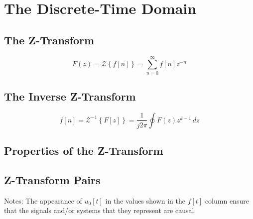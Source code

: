 \section*{The Discrete-Time Domain}
\subsection*{The Z-Transform}

$$
F(z) = \mathcal{Z}\left\{f[n]\right\} = \sum_{n=0}^{\infty} f[n]z^{-n}
$$

\subsection*{The Inverse Z-Transform}

$$
f[n] = \mathcal{Z}^{-1}\left\{F[z]\right\} = \frac{1}{j2\pi}\oint F(z)z^{k-1}\,dz 
$$

\subsection*{Properties of the Z-Transform}



\subsection*{Z-Transform Pairs}



\noindent Notes: The appearance of $u_0[t]$ in the values shown in the $f[t]$ column ensure that 
the signals and/or systems that they represent are causal.
    
\endinput
